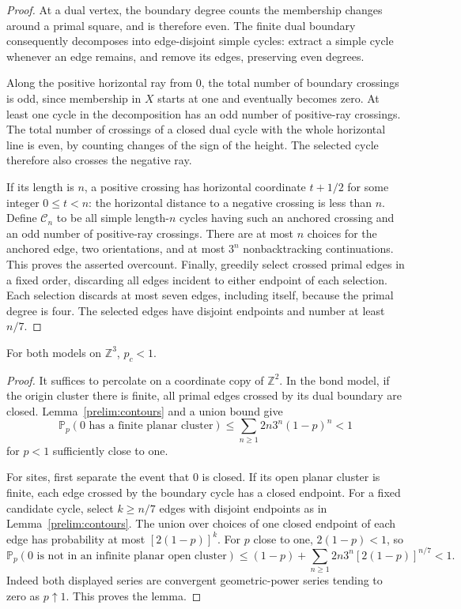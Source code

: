 \begin{proof}
At a dual vertex, the boundary degree counts the membership changes around
a primal square, and is therefore even. The finite dual boundary consequently
decomposes into edge-disjoint simple cycles: extract a simple cycle whenever
an edge remains, and remove its edges, preserving even degrees.

Along the positive horizontal ray from $0$, the total number of boundary
crossings is odd, since membership in $X$ starts at one and eventually becomes
zero. At least one cycle in the decomposition has an odd number of positive-ray
crossings. The total number of crossings of a closed dual cycle with the whole
horizontal line is even, by counting changes of the sign of the height.
The selected cycle therefore also crosses the negative ray.

If its length is $n$, a positive crossing has horizontal coordinate
$t+1/2$ for some integer $0\le t<n$: the horizontal distance to a negative
crossing is less than $n$. Define $\mathcal C_n$ to be all simple length-$n$
cycles having such an anchored crossing and an odd number of positive-ray
crossings. There are at most $n$ choices for the anchored edge, two orientations,
and at most $3^n$ nonbacktracking continuations. This proves the asserted
overcount. Finally, greedily select crossed primal edges in a fixed order,
discarding all edges incident to either endpoint of each selection. Each
selection discards at most seven edges, including itself, because the primal
degree is four. The selected edges have disjoint endpoints and number at least
$n/7$.
\end{proof}

\begin{lemma}\label{prelim:pc-below-one}
For both models on $\mathbb Z^3$, $p_c<1$.
\end{lemma}

\begin{proof}
It suffices to percolate on a coordinate copy of $\mathbb Z^2$. In the bond
model, if the origin cluster there is finite, all primal edges crossed by its
dual boundary are closed. Lemma~\ref{prelim:contours} and a union bound give
\[
 \mathbb P_p(0\text{ has a finite planar cluster})
 \le \sum_{n\ge1}2n3^n(1-p)^n<1
\]
for $p<1$ sufficiently close to one.

For sites, first separate the event that $0$ is closed. If its open planar
cluster is finite, each edge crossed by the boundary cycle has a closed
endpoint. For a fixed candidate cycle, select $k\ge n/7$ edges with disjoint
endpoints as in Lemma~\ref{prelim:contours}. The union over choices of one
closed endpoint of each edge has probability at most $[2(1-p)]^k$.
For $p$ close to one, $2(1-p)<1$, so
\[
 \mathbb P_p(0\text{ is not in an infinite planar open cluster})
 \le (1-p)+\sum_{n\ge1}2n3^n[2(1-p)]^{n/7}<1.
\]
Indeed both displayed series are convergent geometric-power series tending
to zero as $p\uparrow1$. This proves the lemma.
\end{proof}

